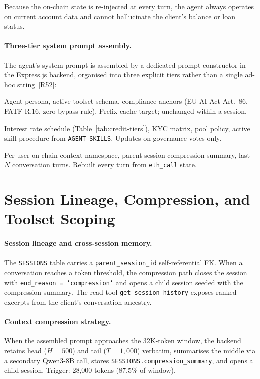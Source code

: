 \documentclass[12pt,a4paper]{report}
\begin{document}
\noindent Because the on-chain state is re-injected at every turn, the agent always operates on current account data and cannot hallucinate the client's balance or loan status.

\paragraph{Three-tier system prompt assembly.}
The agent's system prompt is assembled by a dedicated prompt constructor in the Express.js backend, organised into three explicit tiers rather than a single ad-hoc string~[R52]:

\begin{description}[noitemsep,leftmargin=0pt]
\item[\textbf{Stable tier.}] Agent persona, active toolset schema, compliance anchors (EU AI Act Art.~86, FATF R.16, zero-bypass rule). Prefix-cache target; unchanged within a session.
\item[\textbf{Context tier.}] Interest rate schedule (Table~\ref{tab:credit-tiers}), KYC matrix, pool policy, active skill procedure from \texttt{AGENT\_SKILLS}. Updates on governance votes only.
\item[\textbf{Volatile tier.}] Per-user on-chain context namespace, parent-session compression summary, last $N$ conversation turns. Rebuilt every turn from \texttt{eth\_call} state.
\end{description}

\section{Session Lineage, Compression, and Toolset Scoping}

\paragraph{Session lineage and cross-session memory.}
The \texttt{SESSIONS} table carries a \texttt{parent\_session\_id} self-referential FK. When a conversation reaches a token threshold, the compression path closes the session with \texttt{end\_reason = 'compression'} and opens a child session seeded with the compression summary. The read tool \texttt{get\_session\_history} exposes ranked excerpts from the client's conversation ancestry.

\paragraph{Context compression strategy.}
When the assembled prompt approaches the 32K-token window, the backend retains head ($H{=}500$) and tail ($T{=}1{,}000$) verbatim, summarises the middle via a secondary Qwen3-8B call, stores \texttt{SESSIONS.compression\_summary}, and opens a child session. Trigger: 28{,}000 tokens (87.5\% of window).
\end{document}
